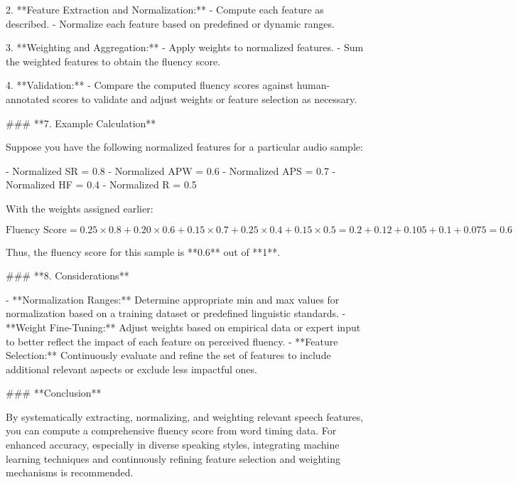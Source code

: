 2. **Feature Extraction and Normalization:**
   - Compute each feature as described.
   - Normalize each feature based on predefined or dynamic ranges.

3. **Weighting and Aggregation:**
   - Apply weights to normalized features.
   - Sum the weighted features to obtain the fluency score.

4. **Validation:**
   - Compare the computed fluency scores against human-annotated scores to validate and adjust weights or feature selection as necessary.

### **7. Example Calculation**

Suppose you have the following normalized features for a particular audio sample:

- Normalized SR = 0.8
- Normalized APW = 0.6
- Normalized APS = 0.7
- Normalized HF = 0.4
- Normalized R = 0.5

With the weights assigned earlier:

\[
\text{Fluency Score} = 0.25 \times 0.8 + 0.20 \times 0.6 + 0.15 \times 0.7 + 0.25 \times 0.4 + 0.15 \times 0.5 = 0.2 + 0.12 + 0.105 + 0.1 + 0.075 = 0.6
\]

Thus, the fluency score for this sample is **0.6** out of **1**.

### **8. Considerations**

- **Normalization Ranges:** Determine appropriate min and max values for normalization based on a training dataset or predefined linguistic standards.
- **Weight Fine-Tuning:** Adjust weights based on empirical data or expert input to better reflect the impact of each feature on perceived fluency.
- **Feature Selection:** Continuously evaluate and refine the set of features to include additional relevant aspects or exclude less impactful ones.

### **Conclusion**

By systematically extracting, normalizing, and weighting relevant speech features, you can compute a comprehensive fluency score from word timing data. For enhanced accuracy, especially in diverse speaking styles, integrating machine learning techniques and continuously refining feature selection and weighting mechanisms is recommended.